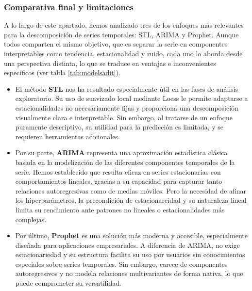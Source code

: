 \subsubsection{Comparativa final y limitaciones}

A lo largo de este apartado, hemos analizado tres de los enfoques más relevantes para la descomposición de series temporales: {STL}, {ARIMA} y {Prophet}. Aunque todos comparten el mismo objetivo, que es separar la serie en componentes interpretables como tendencia, estacionalidad y ruido, cada uno lo aborda desde una perspectiva distinta, lo que se traduce en ventajas e inconvenientes específicos (ver tabla \ref{tab:modelsadit}).

\begin{itemize}


\item El método \textbf{STL} nos ha resultado especialmente útil en las fases de análisis exploratorio. Su uso de suavizado local mediante Loess le permite adaptarse a estacionalidades no necesariamente fijas y proporciona una descomposición visualmente clara e interpretable. Sin embargo, al tratarse de un enfoque puramente descriptivo, su utilidad para la predicción es limitada, y se requieren herramientas adicionales.

\item Por su parte, \textbf{ARIMA} representa una aproximación estadística clásica basada en la modelización de las diferentes componentes temporales de la serie. Hemos establecido que resulta eficaz en series estacionarias con comportamientos lineales, gracias a su capacidad para capturar tanto relaciones autoregresivas como de medias móviles.  Pero la necesidad de afinar los hiperparámetros, la precondición de estacionareidad y su naturaleza lineal limita su rendimiento ante patrones no lineales o estacionalidades más complejas.

\item Por último, \textbf{Prophet} es una solución más moderna y accesible, especialmente diseñada para aplicaciones empresariales. A diferencia de ARIMA, no exige estacionariedad y su estructura facilita su uso por usuarios sin conocimientos especiales sobre series temporales. Sin embargo, carece de componentes autoregresivos y no modela relaciones multivariantes de forma nativa, lo que puede comprometer su versatilidad.

\end{itemize}

